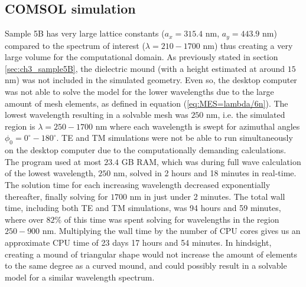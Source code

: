 \subsection{COMSOL simulation}
\label{sec:S5B_results_COMSOL}
Sample 5B has very large lattice constants ($a_x=315.4$ nm, $a_y=443.9$ nm) compared to the spectrum of interest ($\lambda=210-1700$ nm) thus creating a very large volume for the computational domain. As previously stated in section \ref{sec:ch3_sample5B}, the dielectric mound (with a height estimated at around $15$ nm) was not included in the simulated geometry. Even so, the desktop computer was not able to solve the model for the lower wavelengths due to the large amount of mesh elements, as defined in equation (\ref{eq:MES=lambda/6n}). The lowest wavelength resulting in a solvable mesh was $250$ nm, i.e. the simulated region is $\lambda=250-1700$ nm where each wavelength is swept for azimuthal angles $\phi_0=0^\circ-180^\circ$. TE and TM simulations were not be able to run simultaneously on the desktop computer due to the computationally demanding calculations. The program used at most $23.4$ GB RAM, which was during full wave calculation of the lowest wavelength, $250$ nm, solved in 2 hours and 18 minutes in real-time. The solution time for each increasing wavelength decreased exponentially thereafter, finally solving for $1700$ nm in just under 2 minutes. The total wall time, including both TE and TM simulations, was 94 hours and 59 minutes, where over $82\%$ of this time was spent solving for wavelengths in the region $250-900$ nm. Multiplying the wall time by the number of CPU cores gives us an approximate CPU time of 23 days 17 hours and 54 minutes. In hindsight, creating a mound of triangular shape would not increase the amount of elements to the same degree as a curved mound, and could possibly result in a solvable model for a similar wavelength spectrum.


